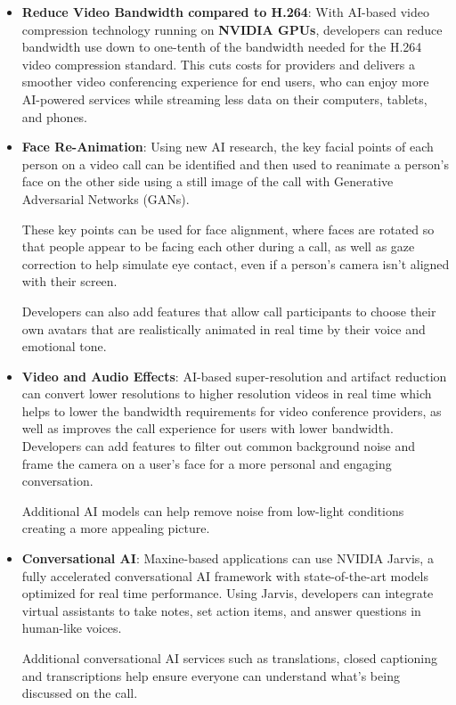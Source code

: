 \begin{itemize}
    \item \textbf{Reduce Video Bandwidth compared to H.264}: 
    With AI-based video compression technology running on \textbf{NVIDIA GPUs}, 
    developers can reduce bandwidth use down to one-tenth of the bandwidth needed 
    for the H.264 video compression standard. This cuts costs for providers and 
    delivers a smoother video conferencing experience for end users, who can enjoy 
    more AI-powered services while streaming less data on their computers, tablets, and phones.
    
    \item \textbf{Face Re-Animation}:
    Using new AI research, the key facial points of each person on a video call can be identified
    and then used to reanimate a person’s face on the other side using a still image
    of the call with Generative Adversarial Networks (GANs).
    
    These key points can be used for face alignment, where faces are rotated so that
    people appear to be facing each other during a call, as well as gaze correction 
    to help simulate eye contact, even if a person’s camera isn’t aligned with their screen.
    
    Developers can also add features that allow call participants to choose their
    own avatars that are realistically animated in real time by their voice and emotional tone.

    \item \textbf{Video and Audio Effects}:
    AI-based super-resolution and artifact reduction can convert lower resolutions to higher
    resolution videos in real time which helps to lower the bandwidth requirements for video 
    conference providers, as well as improves the call experience for users with lower bandwidth. 
    Developers can add features to filter out common background noise and frame the camera on a user’s 
    face for a more personal and engaging conversation.
    
    Additional AI models can help remove noise from low-light conditions creating a more appealing picture.

    \item \textbf{Conversational AI}:
    Maxine-based applications can use NVIDIA Jarvis, a fully accelerated conversational
    AI framework with state-of-the-art models optimized for real time performance. Using Jarvis, 
    developers can integrate virtual assistants to take notes, set action items, and answer questions 
    in human-like voices.
    
    Additional conversational AI services such as translations, closed captioning and transcriptions help 
    ensure everyone can understand what’s being discussed on the call.
\end{itemize}

